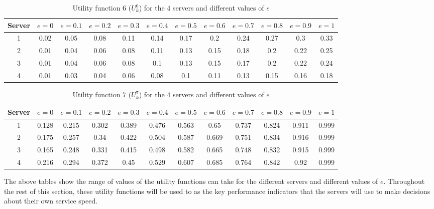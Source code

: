 \begin{table}[H]
    \caption{Utility function \(6\) (\(U_k^6\)) for the \(4\) servers and
    different values of \(e\)}
    \label{tab:case_study_utility_6_all_servers}
    \begin{adjustbox}{width=\columnwidth,center}
        \begin{tabular}{|c|c|c|c|c|c|c|c|c|c|c|c|}
            \hline
            Server & \(e = 0\) & \(e = 0.1\) & \(e = 0.2\) & \(e = 0.3\)
                   & \(e = 0.4\) & \(e = 0.5\) & \(e = 0.6\) & \(e = 0.7\)
                   & \(e = 0.8\) & \(e = 0.9\) & \(e = 1\) \\
            \hline
            1 & 0.02 & 0.05 & 0.08 & 0.11 & 0.14 & 0.17 & 0.2 & 0.24
            & 0.27 & 0.3 & 0.33 \\ 
            2 & 0.01 & 0.04 & 0.06 & 0.08 & 0.11 & 0.13 & 0.15 & 0.18
            & 0.2 & 0.22 & 0.25 \\ 
            3 & 0.01 & 0.04 & 0.06 & 0.08 & 0.1 & 0.13 & 0.15 & 0.17
            & 0.2 & 0.22 & 0.24 \\ 
            4 & 0.01 & 0.03 & 0.04 & 0.06 & 0.08 & 0.1 & 0.11 & 0.13
            & 0.15 & 0.16 & 0.18 \\ 
            \hline
        \end{tabular}
    \end{adjustbox}
\end{table}

\begin{table}[H]
    \caption{Utility function \(7\) (\(U_k^7\)) for the \(4\) servers and
    different values of \(e\)}
    \label{tab:case_study_utility_7_all_servers}
    \begin{adjustbox}{width=\columnwidth,center}
        \begin{tabular}{|c|c|c|c|c|c|c|c|c|c|c|c|}
            \hline
            Server & \(e = 0\) & \(e = 0.1\) & \(e = 0.2\) & \(e = 0.3\)
                   & \(e = 0.4\) & \(e = 0.5\) & \(e = 0.6\) & \(e = 0.7\)
                   & \(e = 0.8\) & \(e = 0.9\) & \(e = 1\) \\
            \hline
            1 & 0.128 & 0.215 & 0.302 & 0.389 & 0.476 & 0.563 & 0.65 & 0.737
            & 0.824 & 0.911 & 0.999 \\ 
            2 & 0.175 & 0.257 & 0.34 & 0.422 & 0.504 & 0.587 & 0.669 & 0.751
            & 0.834 & 0.916 & 0.999 \\ 
            3 & 0.165 & 0.248 & 0.331 & 0.415 & 0.498 & 0.582 & 0.665 & 0.748
            & 0.832 & 0.915 & 0.999 \\ 
            4 & 0.216 & 0.294 & 0.372 & 0.45 & 0.529 & 0.607 & 0.685 & 0.764
            & 0.842 & 0.92 & 0.999 \\ 
            \hline
        \end{tabular}
    \end{adjustbox}
\end{table}

The above tables show the range of values of the utility functions can take
for the different servers and different values of \(e\).
Throughout the rest of this section, these utility functions will be used to
as the key performance indicators that the servers will use to make decisions
about their own service speed.
